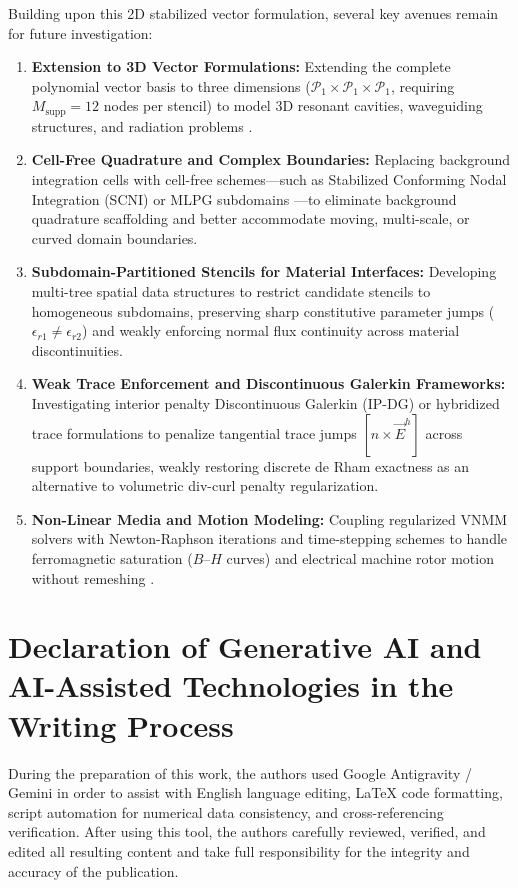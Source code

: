 \documentclass[preprint,12pt]{elsarticle}
\begin{document}
Building upon this 2D stabilized vector formulation, several key avenues remain for future investigation:
\begin{enumerate}
    \item \textbf{Extension to 3D Vector Formulations:} 
    Extending the complete polynomial vector basis to three dimensions ($\mathcal{P}_1 \times \mathcal{P}_1 \times \mathcal{P}_1$, requiring $M_{\mathrm{supp}} = 12$ nodes per stencil) to model 3D resonant cavities, waveguiding structures, and radiation problems \cite{goncalves2023vector}.

    \item \textbf{Cell-Free Quadrature and Complex Boundaries:} 
    Replacing background integration cells with cell-free schemes---such as Stabilized Conforming Nodal Integration (SCNI) \cite{chen2001stabilized} or MLPG subdomains \cite{atluri2002meshless}---to eliminate background quadrature scaffolding and better accommodate moving, multi-scale, or curved domain boundaries.

    \item \textbf{Subdomain-Partitioned Stencils for Material Interfaces:} 
    Developing multi-tree spatial data structures \cite{parreira2006efficient} to restrict candidate stencils to homogeneous subdomains, preserving sharp constitutive parameter jumps ($\epsilon_{r1} \neq \epsilon_{r2}$) and weakly enforcing normal flux continuity across material discontinuities.

    \item \textbf{Weak Trace Enforcement and Discontinuous Galerkin Frameworks:} 
    Investigating interior penalty Discontinuous Galerkin (IP-DG) or hybridized trace formulations to penalize tangential trace jumps $[\hat{n} \times \vec{E}^h]$ across support boundaries, weakly restoring discrete de Rham exactness as an alternative to volumetric div-curl penalty regularization.

    \item \textbf{Non-Linear Media and Motion Modeling:} 
    Coupling regularized VNMM solvers with Newton-Raphson iterations and time-stepping schemes to handle ferromagnetic saturation ($B\text{--}H$ curves) and electrical machine rotor motion without remeshing \cite{coppoli2012induction}.
\end{enumerate}


\section*{Declaration of Generative AI and AI-Assisted Technologies in the Writing Process}
During the preparation of this work, the authors used Google Antigravity / Gemini in order to assist with English language editing, LaTeX code formatting, script automation for numerical data consistency, and cross-referencing verification. After using this tool, the authors carefully reviewed, verified, and edited all resulting content and take full responsibility for the integrity and accuracy of the publication.
\end{document}

